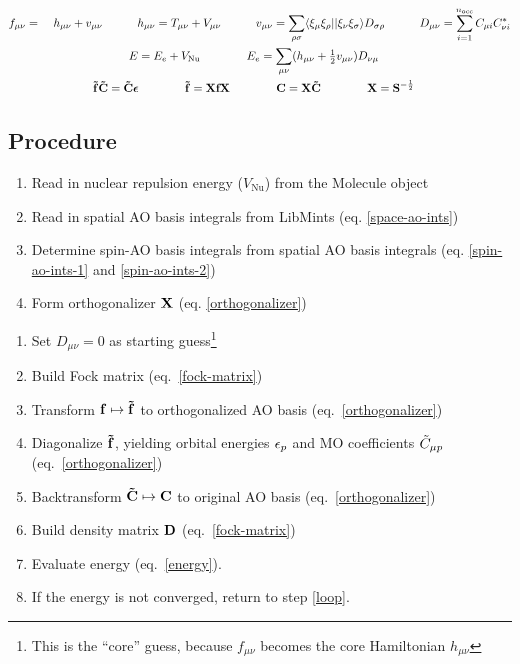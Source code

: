\documentclass[fleqn]{article}
\begin{document}
\noindent
{}
\begin{gather}
\begin{aligned}
\label{fock-matrix}
&
  f_{\mu\nu}
=&\
  h_{\mu\nu}
+
  v_{\mu\nu}
\hspace{30pt}
  h_{\mu\nu}
=
  T_{\mu\nu}+V_{\mu\nu}
\hspace{30pt}
  v_{\mu\nu}
=
  \sum_{\rho\sigma}
  \langle\xi_\mu\xi_\rho||\xi_\nu\xi_\sigma\rangle
  D_{\sigma\rho}
\hspace{30pt}
  D_{\mu\nu}
=
  \sum_{i=1}^{n_\text{occ}}
  C_{\mu i} C_{\nu i}^*
\end{aligned}\\
\begin{aligned}
\label{energy}
&
  E
=
  E_e
+
  V_\mathrm{Nu}
&&\hspace{30pt}
  E_e
=
  \sum_{\mu\nu}
  (h_{\mu\nu}+\tfrac{1}{2}v_{\mu\nu})D_{\nu\mu}
\end{aligned}\\
\begin{aligned}
\label{orthogonalizer}
&
  \mathbf{\tilde{f}}\mathbf{\tilde{C}}
=
  \mathbf{\tilde{C}}\bm{\epsilon}
&&\hspace{30pt}
  \mathbf{\tilde{f}}
=
  \mathbf{X}\mathbf{f}\mathbf{X}
&&\hspace{30pt}
  \mathbf{C}
=
  \mathbf{X}
  \mathbf{\tilde{C}}
&&\hspace{30pt}
  \mathbf{X}
=
  \mathbf{S}^{-\frac{1}{2}}
\end{aligned}
\end{gather}


\subsection*{Procedure}

\begin{enumerate}
  \item Read in nuclear repulsion energy ($V_\mathrm{Nu}$) from the Molecule object
  \item Read in spatial AO basis integrals from LibMints (eq. \ref{space-ao-ints})
  \item Determine spin-AO basis integrals from spatial AO basis integrals (eq. \ref{spin-ao-ints-1} and \ref{spin-ao-ints-2})
  \item Form orthogonalizer $\mathbf{X}$ (eq. \ref{orthogonalizer})
\end{enumerate}

\noindent
{}
\begin{enumerate}
  \item Set $D_{\mu\nu}=0$ as starting guess\footnote{This is the ``core'' guess, because $f_{\mu\nu}$ becomes the core Hamiltonian $h_{\mu\nu}$}
  \item\label{loop} Build Fock matrix (eq.~\ref{fock-matrix})
  \item Transform $\mathbf{f}\mapsto\mathbf{\tilde{f}}$ to orthogonalized AO basis (eq.~\ref{orthogonalizer})
  \item Diagonalize $\mathbf{\tilde{f}}$, yielding orbital energies $\epsilon_p$ and MO coefficients $\tilde{C}_{\mu p}$ (eq.~\ref{orthogonalizer})
  \item Backtransform $\mathbf{\tilde{C}}\mapsto\mathbf{C}$ to original AO basis (eq.~\ref{orthogonalizer})
  \item Build density matrix $\mathbf{D}$ (eq.~\ref{fock-matrix})
  \item Evaluate energy (eq.~\ref{energy}).
  \item If the energy is not converged, return to step \ref{loop}.
\end{enumerate}
\end{document}
